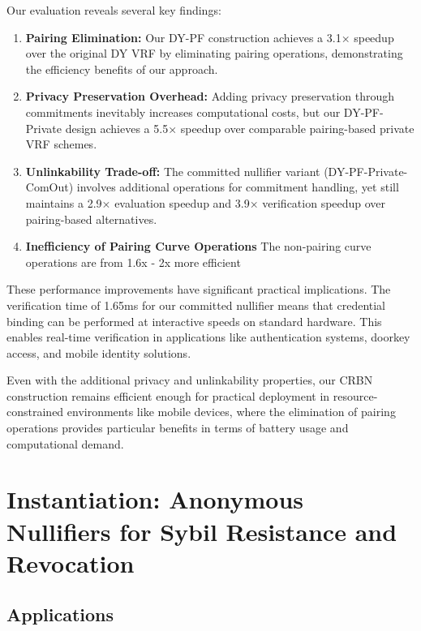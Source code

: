 Our evaluation reveals several key findings:

\begin{enumerate}
    \item \textbf{Pairing Elimination:} Our DY-PF construction achieves a 3.1× speedup over the original DY VRF by eliminating pairing operations, demonstrating the efficiency benefits of our approach.
    
    \item \textbf{Privacy Preservation Overhead:} Adding privacy preservation through commitments inevitably increases computational costs, but our DY-PF-Private design achieves a 5.5× speedup over comparable pairing-based private VRF schemes.
    
    \item \textbf{Unlinkability Trade-off:} The committed nullifier variant (DY-PF-Private-ComOut) involves additional operations for commitment handling, yet still maintains a 2.9× evaluation speedup and 3.9× verification speedup over pairing-based alternatives.

    \item \textbf{Inefficiency of Pairing Curve Operations} The non-pairing curve operations are from 1.6x - 2x more efficient
\end{enumerate}

These performance improvements have significant practical implications. The verification time of 1.65ms for our committed nullifier means that credential binding can be performed at interactive speeds on standard hardware. This enables real-time verification in applications like authentication systems, doorkey access, and mobile identity solutions.

Even with the additional privacy and unlinkability properties, our CRBN construction remains efficient enough for practical deployment in resource-constrained environments like mobile devices, where the elimination of pairing operations provides particular benefits in terms of battery usage and computational demand.




\section{Instantiation: Anonymous Nullifiers for Sybil Resistance and Revocation}\label{sec-instantiation}

\subsection{Applications}

